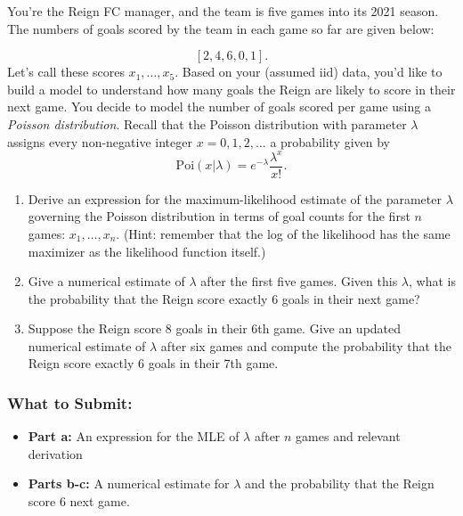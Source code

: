 \documentclass{article}
\begin{document}
\begin{aprob}
    You're the Reign FC manager, and the team is five games into its 2021 season. The numbers of goals scored by the team in each game so far are given below:
    
    \[
      [2, 4, 6, 0, 1].
    \]
    Let's call these scores $x_1, \dots, x_5$. Based on your (assumed iid) data, you'd like to build a model to understand how many goals the Reign are likely to score in their next game. You decide to model the number of goals scored per game using a \emph{Poisson distribution}. Recall that the Poisson distribution with parameter $\lambda$ assigns every non-negative integer $x = 0, 1, 2, \dots$ a probability given by
    \[
      \mathrm{Poi}(x | \lambda) = e^{-\lambda} \frac{\lambda ^ x}{x!}.
    \]
    
    \begin{enumerate}
        \item {} Derive an expression for the maximum-likelihood estimate of the parameter $\lambda$ governing the Poisson distribution in terms of goal counts for the first $n$ games: $x_1, \dots, x_n$. (Hint: remember that the log of the likelihood has the same maximizer as the likelihood function itself.)
        \item {} Give a numerical estimate of $\lambda$ after the first five games. Given this $\lambda$, what is the probability that the Reign score exactly $6$ goals in their next game?
        \item {} Suppose the Reign score 8 goals in their 6th game. Give an updated numerical estimate of $\lambda$ after six games and compute the probability that the Reign score exactly $6$ goals in their 7th game.
    \end{enumerate}
    \subsubsection*{What to Submit:}
    \begin{itemize}
        \item \textbf{Part a:} An expression for the MLE of $\lambda$ after $n$ games and relevant derivation
        \item \textbf{Parts b-c:} A numerical estimate for $\lambda$ and the probability that the Reign score 6 next game.
    \end{itemize}
\end{aprob}

\clearpage{}
\end{document}
